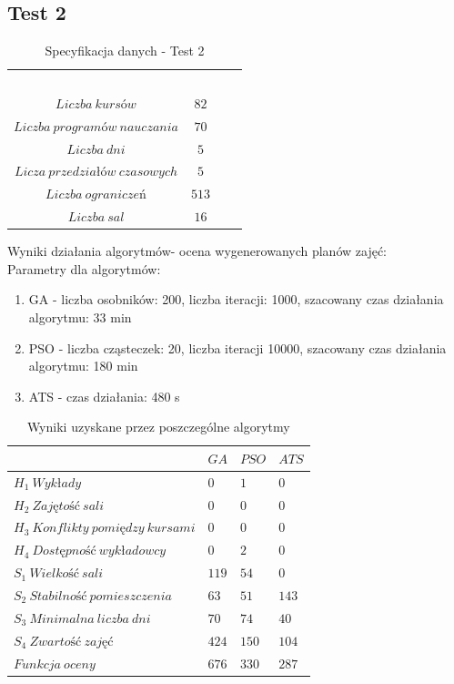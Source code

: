 \subsection{Test 2}
\begin{table}[H]
\begin{center}

\begin{tabular}{ |c|c|c|c| }
\multicolumn{1}{r}{}
 &  \multicolumn{1}{c}{$$}
 & \multicolumn{1}{c}{$$} 
 \\
\cline{1-2}
$Liczba\ kursów$ & $82$\\
\cline{1-2}
$Liczba\ programów\ nauczania$ & $70$\\
\cline{1-2}
$Liczba\ dni$ & $5$ \\
\cline{1-2}
$Licza\ przedziałów\ czasowych$ & $5$ \\
\cline{1-2}
$Liczba\ ograniczeń$ & $513$ \\
\cline{1-2}
$Liczba\ sal$ & $16$ \\
\cline{1-2}
\end{tabular}
\end{center}
\caption {Specyfikacja danych - Test 2}
\end{table}
\par Wyniki działania algorytmów- ocena wygenerowanych planów zajęć: \\
Parametry dla algorytmów:
\begin{enumerate}
\item GA - liczba osobników: 200, liczba iteracji: 1000, szacowany czas działania algorytmu: 33 min
\item PSO - liczba cząsteczek: 20, liczba iteracji 10000, szacowany czas działania algorytmu: 180 min
\item ATS - czas działania: 480 s
\end{enumerate}
\begin{table}[H]
\begin{center}

\begin{tabular}{ |l|l|l|l| }
\hline
 & $GA$ & $PSO$ & $ATS$\\
\hline
${H}_{1}\ Wykłady$ & $0$ & $1$ & $0$\\
\hline
$H_{2}\ Zajętość\ sali$ & $0$ & $0$ & $0$\\
\hline
$H_{3}\ Konflikty\ pomiędzy\ kursami$ & $0$ & $0$ & $0$ \\
\hline
$H_{4}\ Dostępność\ wykładowcy$ & $0$ & $2$ & $0$ \\
\hline
$S_{1}\ Wielkość\ sali$ & $119$ & $54$ & $0$ \\
\hline
$S_{2}\ Stabilność\ pomieszczenia$ & $63$ & $51$ & $143$ \\
\hline
$S_{3}\ Minimalna\ liczba\ dni$ & $70$ & $74$ & $40$ \\
\hline
$S_{4}\ Zwartość\ zajęć$ & $424$ & $150$ & $104$ \\
\hline
$Funkcja\ oceny$ & $676$ & $330$ & $287$ \\
\hline
\end{tabular}
\end{center}
\caption {Wyniki uzyskane przez poszczególne algorytmy}
\end{table}


